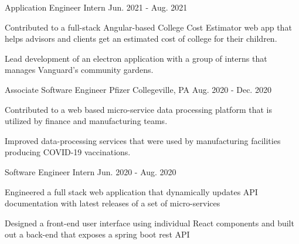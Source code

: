 \begin{cventries}
  \cventry
    {Application Engineer Intern} %
    {} %
    {} %
    {Jun. 2021 - Aug. 2021} %
    {
      \begin{cvitems} %
        \item {Contributed to a full-stack Angular-based College Cost Estimator web app that helps advisors and clients get an estimated cost of college for their children.}
        \item {Lead development of an electron application with a group of interns that manages Vanguard's community gardens.}
      \end{cvitems}
    }

  \cventry
    {Associate Software Engineer} %
    {Pfizer} %
    {Collegeville, PA} %
    {Aug. 2020 - Dec. 2020} %
    {
      \begin{cvitems} %
        \item {Contributed to a web based micro-service data processing platform that is utilized by finance and manufacturing teams.}
        \item {Improved data-processing services that were used by manufacturing facilities producing COVID-19 vaccinations.}
      \end{cvitems}
    }

  \cventry
    {Software Engineer Intern} %
    {} %
    {} %
    {Jun. 2020 - Aug. 2020} %
    {
      \begin{cvitems} %
        \item {Engineered a full stack web application that dynamically updates API documentation with latest releases of a set of micro-services}
        \item {Designed a front-end user interface using individual React components and built out a back-end that exposes a spring boot rest API}
      \end{cvitems}
    }

\end{cventries}
